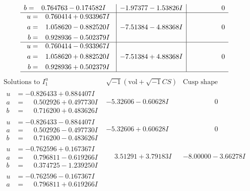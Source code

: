 \documentclass[1p]{elsarticle_modified}
\theoremstyle{definition}
\newcommand{\I}{\sqrt{-1}}
\begin{document}
$$\begin{array}{c|c|c}
\begin{aligned}
b &= \phantom{-}0.764763 - 0.174582 I\end{aligned}
 & -1.97377 - 1.53826 I & \phantom{-0.000000 } 0 \\ \hline\begin{aligned}
u &= \phantom{-}0.760414 + 0.933967 I \\
a &= \phantom{-}1.058620 - 0.882520 I \\
b &= \phantom{-}0.928936 - 0.502379 I\end{aligned}
 & -7.51384 - 4.88368 I & \phantom{-0.000000 } 0 \\ \hline\begin{aligned}
u &= \phantom{-}0.760414 - 0.933967 I \\
a &= \phantom{-}1.058620 + 0.882520 I \\
b &= \phantom{-}0.928936 + 0.502379 I\end{aligned}
 & -7.51384 + 4.88368 I & \phantom{-0.000000 } 0\\
 \hline 
 \end{array}$$\newpage$$\begin{array}{c|c|c}  
\text{Solutions to }I^u_{1}& \I (\text{vol} + \sqrt{-1}CS) & \text{Cusp shape}\\
 \hline 
\begin{aligned}
u &= -0.826433 + 0.884407 I \\
a &= \phantom{-}0.502926 + 0.497730 I \\
b &= \phantom{-}0.716200 + 0.483626 I\end{aligned}
 & -5.32606 - 0.60628 I & \phantom{-0.000000 } 0 \\ \hline\begin{aligned}
u &= -0.826433 - 0.884407 I \\
a &= \phantom{-}0.502926 - 0.497730 I \\
b &= \phantom{-}0.716200 - 0.483626 I\end{aligned}
 & -5.32606 + 0.60628 I & \phantom{-0.000000 } 0 \\ \hline\begin{aligned}
u &= -0.762596 + 0.167367 I \\
a &= \phantom{-}0.796811 - 0.619266 I \\
b &= \phantom{-}0.374725 - 1.239250 I\end{aligned}
 & \phantom{-}3.51291 + 3.79183 I & -8.00000 - 3.66278 I \\ \hline\begin{aligned}
u &= -0.762596 - 0.167367 I \\
a &= \phantom{-}0.796811 + 0.619266 I \\

\end{aligned}
\end{array}$$
\end{document}
